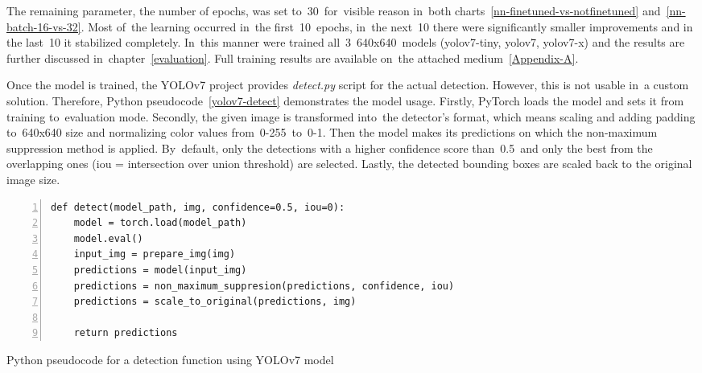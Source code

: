 The remaining parameter, the number of epochs, was set to~30~for~visible reason in~both charts~\ref{nn-finetuned-vs-notfinetuned} and~\ref{nn-batch-16-vs-32}. Most of~the learning occurred in~the first~10~epochs, in~the next~10 there were significantly smaller improvements and in the last~10 it stabilized completely. In~this manner were trained all~3~640x640~models (yolov7-tiny, yolov7, yolov7-x) and the results are further discussed in~chapter~\ref{evaluation}. Full training results are available on~the attached medium~\ref{Appendix-A}.

Once the model is trained, the YOLOv7 project provides \emph{detect.py} script for the \hbox{actual} detection. However, this is not usable in~a custom solution. Therefore, Python pseudocode~\ref{yolov7-detect} demonstrates the model usage. Firstly, PyTorch loads the model and sets it from training to~evaluation mode. Secondly, the given image is transformed into~the detector's format, which means scaling and adding padding to~640x640 size and normalizing color values from~0-255~to~\hbox{0-1}. Then the model makes its predictions on which the non-maximum suppression method is applied. By~default, only the detections with a higher confidence score than~0.5~and only the best from the overlapping ones (iou = intersection over union threshold) are selected. Lastly, the detected bounding boxes are scaled back to the original image size.

\begin{algorithm}[!hbt]
    \begin{lstlisting}[keywords={def, return}, xleftmargin=20pt, numbers=left]
def detect(model_path, img, confidence=0.5, iou=0):
    model = torch.load(model_path)
    model.eval()
    input_img = prepare_img(img)
    predictions = model(input_img)
    predictions = non_maximum_suppresion(predictions, confidence, iou)
    predictions = scale_to_original(predictions, img)
        
    return predictions
    \end{lstlisting}
    \caption{Python pseudocode for a detection function using YOLOv7 model}
    \label{yolov7-detect}
\end{algorithm}

